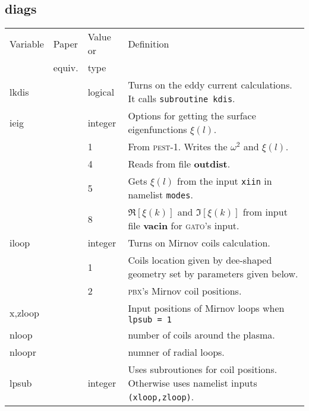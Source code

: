 \documentclass[10pt]{article}
\newcommand{\stylb}[1]{\textbf{#1}}
\newcommand{\stylc}[1]{\textsc{#1}}
\newcommand{\style}[1]{\texttt{#1}}
\begin{document}
\subsection{diags}
\label{sec:diags}

\begin{center}
\begin{tabular}{|l|l|p{1.0in}|p{3.8in}|}
\hline
Variable & Paper  & Value or &  Definition \\ 
         & equiv. &  type  & \\ \hline

lkdis & & logical & Turns on the eddy current calculations. It calls
                    \style{subroutine kdis}. \\

ieig  & & integer & Options for getting the surface eigenfunctions $\xi(l)$. \\
      & & 1 & From \stylc{pest-1}. Writes the $\omega^2$ and $\xi(l)$.\\

      & & 4 & Reads from file \stylb{outdist}. \\

      & & 5 & Gets $\xi(l)$ from the input \style{xiin} in namelist
              \style{modes}. \\
      & & 8 & $\Re[\xi(k)]$ and $\Im[\xi(k)]$ from input file
              \stylb{vacin} for \stylc{gato}'s input. \\

iloop & & integer & Turns on Mirnov coils calculation. \\
     
      & & 1 & Coils location given by dee-shaped geometry set by
      parameters given below. \\
      
      & & 2 & \stylc{pbx}'s Mirnov coil positions. \\

x,zloop & & & Input positions of Mirnov loops when \style{lpsub = 1} \\

nloop & & & number of coils around the plasma. \\

nloopr  & & & numner of radial loops.  \\

lpsub & & integer & Uses subroutiones for coil positions. Otherwise
uses namelist inputs \style{(xloop,zloop)}. \\


\end{tabular}
\end{center}
\end{document}
